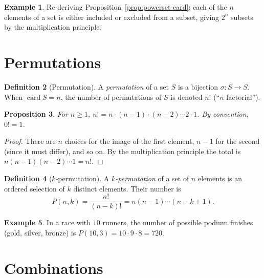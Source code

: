\documentclass[12pt,a4paper,openany]{book}
\theoremstyle{definition}
\newtheorem{definition}{Definition}[chapter]
\newtheorem{example}[definition]{Example}
\theoremstyle{plain}
\newtheorem{proposition}[definition]{Proposition}
\theoremstyle{remark}
\DeclareMathOperator{\card}{card}
\begin{document}
\begin{example}\label{ex:counting-subsets}
Re-deriving Proposition~\ref{prop:powerset-card}: each of the $n$ elements of
a set is either included or excluded from a subset, giving $2^n$ subsets by
the multiplication principle.
\end{example}

\section{Permutations}
\label{sec:permutations}

\begin{definition}[Permutation]\label{def:permutation}
A \emph{permutation} of a set $S$ is a bijection $\sigma\colon S \to S$.
When $\card{S} = n$, the number of permutations of $S$ is denoted $n!$
(``$n$ factorial'').
\end{definition}

\begin{proposition}\label{prop:n-factorial}
For $n \geq 1$, $n! = n \cdot (n-1) \cdot (n-2) \cdots 2 \cdot 1$.
By convention, $0! = 1$.
\end{proposition}

\begin{proof}
There are $n$ choices for the image of the first element, $n - 1$ for the
second (since it must differ), and so on. By the multiplication principle
the total is $n(n-1)(n-2)\cdots 1 = n!$.
\end{proof}

\begin{definition}[$k$-permutation]\label{def:k-permutation}
A \emph{$k$-permutation} of a set of $n$ elements is an ordered selection
of $k$ distinct elements. Their number is
\[
  P(n, k) = \frac{n!}{(n-k)!} = n(n-1)\cdots(n-k+1).
\]
\end{definition}

\begin{example}\label{ex:podium}
In a race with $10$ runners, the number of possible podium finishes
(gold, silver, bronze) is $P(10, 3) = 10 \cdot 9 \cdot 8 = 720$.
\end{example}

\section{Combinations}
\label{sec:combinations}
\end{document}
